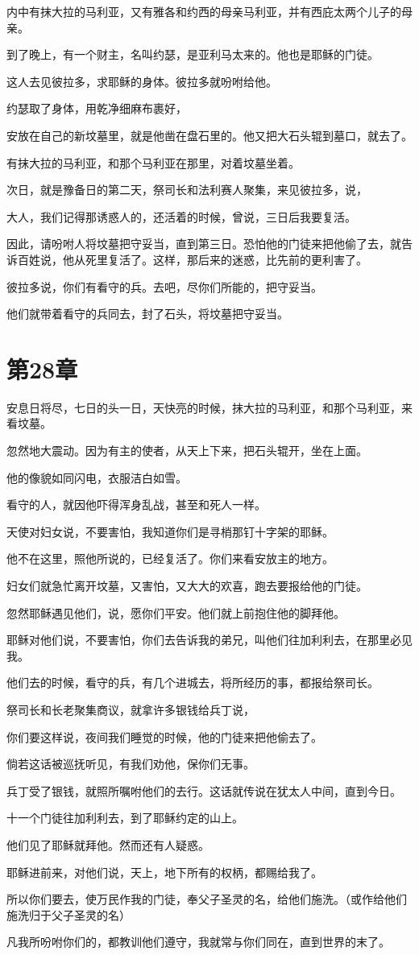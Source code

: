 \documentclass[12pt,oneside]{book}
\begin{document}
内中有抹大拉的马利亚，又有雅各和约西的母亲马利亚，并有西庇太两个儿子的母亲。

到了晚上，有一个财主，名叫约瑟，是亚利马太来的。他也是耶稣的门徒。

这人去见彼拉多，求耶稣的身体。彼拉多就吩咐给他。

约瑟取了身体，用乾净细麻布裹好，

安放在自己的新坟墓里，就是他凿在盘石里的。他又把大石头辊到墓口，就去了。

有抹大拉的马利亚，和那个马利亚在那里，对着坟墓坐着。

次日，就是豫备日的第二天，祭司长和法利赛人聚集，来见彼拉多，说，

大人，我们记得那诱惑人的，还活着的时候，曾说，三日后我要复活。

因此，请吩咐人将坟墓把守妥当，直到第三日。恐怕他的门徒来把他偷了去，就告诉百姓说，他从死里复活了。这样，那后来的迷惑，比先前的更利害了。

彼拉多说，你们有看守的兵。去吧，尽你们所能的，把守妥当。

他们就带着看守的兵同去，封了石头，将坟墓把守妥当。

\chapter{第28章}
安息日将尽，七日的头一日，天快亮的时候，抹大拉的马利亚，和那个马利亚，来看坟墓。

忽然地大震动。因为有主的使者，从天上下来，把石头辊开，坐在上面。

他的像貌如同闪电，衣服洁白如雪。

看守的人，就因他吓得浑身乱战，甚至和死人一样。

天使对妇女说，不要害怕，我知道你们是寻梢那钉十字架的耶稣。

他不在这里，照他所说的，已经复活了。你们来看安放主的地方。

妇女们就急忙离开坟墓，又害怕，又大大的欢喜，跑去要报给他的门徒。

忽然耶稣遇见他们，说，愿你们平安。他们就上前抱住他的脚拜他。

耶稣对他们说，不要害怕，你们去告诉我的弟兄，叫他们往加利利去，在那里必见我。

他们去的时候，看守的兵，有几个进城去，将所经历的事，都报给祭司长。

祭司长和长老聚集商议，就拿许多银钱给兵丁说，

你们要这样说，夜间我们睡觉的时候，他的门徒来把他偷去了。

倘若这话被巡抚听见，有我们劝他，保你们无事。

兵丁受了银钱，就照所嘱咐他们的去行。这话就传说在犹太人中间，直到今日。

十一个门徒往加利利去，到了耶稣约定的山上。

他们见了耶稣就拜他。然而还有人疑惑。

耶稣进前来，对他们说，天上，地下所有的权柄，都赐给我了。

所以你们要去，使万民作我的门徒，奉父子圣灵的名，给他们施洗。（或作给他们施洗归于父子圣灵的名）

凡我所吩咐你们的，都教训他们遵守，我就常与你们同在，直到世界的末了。




\backmatter
\end{document}
